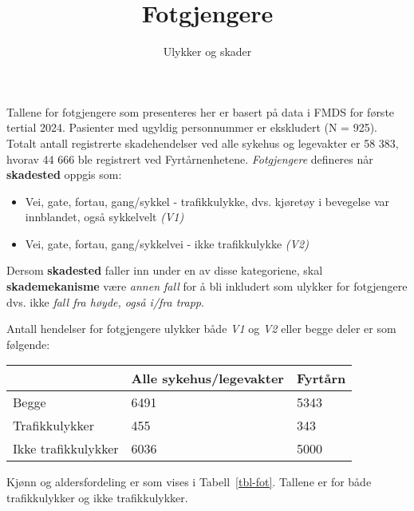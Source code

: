 \documentclass[
  letterpaper,
  DIV=11,
  numbers=noendperiod]{scrartcl}
\title{Fotgjengere}
\subtitle{Ulykker og skader}
\author{}
\date{}
\providecommand{\tightlist}{%
  \setlength{\itemsep}{0pt}\setlength{\parskip}{0pt}}\usepackage{longtable,booktabs,array}
\begin{document}
\maketitle


Tallene for fotgjengere som presenteres her er basert på data i FMDS for
første tertial 2024. Pasienter med ugyldig personnummer er ekskludert (N
= 925). Totalt antall registrerte skadehendelser ved alle sykehus og
legevakter er 58 383, hvorav 44 666 ble registrert ved Fyrtårnenhetene.
\emph{Fotgjengere} defineres når \textbf{skadested} oppgis som:

\begin{itemize}
\tightlist
\item
  Vei, gate, fortau, gang/sykkel - trafikkulykke, dvs. kjøretøy i
  bevegelse var innblandet, også sykkelvelt \emph{(V1)}
\item
  Vei, gate, fortau, gang/sykkelvei - ikke trafikkulykke \emph{(V2)}
\end{itemize}

Dersom \textbf{skadested} faller inn under en av disse kategoriene, skal
\textbf{skademekanisme} være \emph{annen fall} for å bli inkludert som
ulykker for fotgjengere dvs. ikke \emph{fall fra høyde, også i/fra
trapp}.

Antall hendelser for fotgjengere ulykker både \emph{V1} og \emph{V2}
eller begge deler er som følgende:

\begin{longtable}[]{@{}lll@{}}
\toprule\noalign{}
& Alle sykehus/legevakter & Fyrtårn \\
\midrule\noalign{}
\endhead
\bottomrule\noalign{}
\endlastfoot
Begge & 6491 & 5343 \\
Trafikkulykker & 455 & 343 \\
Ikke trafikkulykker & 6036 & 5000 \\
\end{longtable}

Kjønn og aldersfordeling er som vises i Tabell~\ref{tbl-fot}. Tallene er
for både trafikkulykker og ikke trafikkulykker.

\begingroup
\fontsize{12.0pt}{14.4pt}\selectfont
\end{document}

